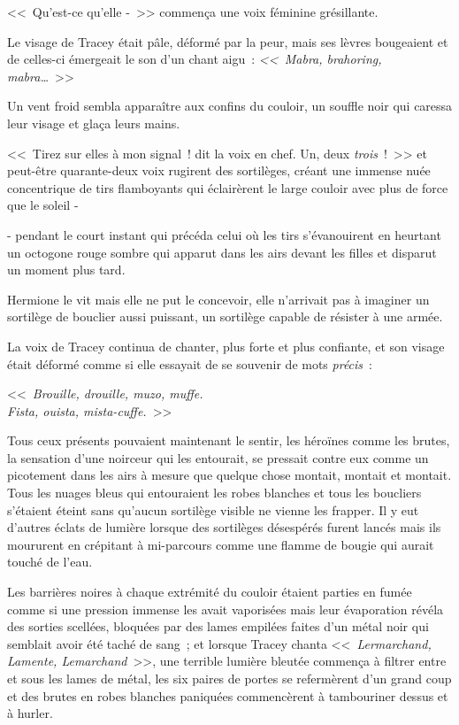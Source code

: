<<~Qu'est-ce qu'elle -~>> commença une voix féminine grésillante.

Le visage de Tracey était pâle, déformé par la peur, mais ses lèvres bougeaient et de celles-ci émergeait le son d'un chant aigu~: \emph{<<~Mabra, brahoring, mabra…}~>>

Un vent froid sembla apparaître aux confins du couloir, un souffle noir qui caressa leur visage et glaça leurs mains.

<<~Tirez sur elles à mon signal~! dit la voix en chef. Un, deux \emph{trois}~!~>> et peut-être quarante-deux voix rugirent des sortilèges, créant une immense nuée concentrique de tirs flamboyants qui éclairèrent le large couloir avec plus de force que le soleil -

- pendant le court instant qui précéda celui où les tirs s'évanouirent en heurtant un octogone rouge sombre qui apparut dans les airs devant les filles et disparut un moment plus tard.

Hermione le vit mais elle ne put le concevoir, elle n'arrivait pas à imaginer un sortilège de bouclier aussi puissant, un sortilège capable de résister à une armée.

La voix de Tracey continua de chanter, plus forte et plus confiante, et son visage était déformé comme si elle essayait de se souvenir de mots \emph{précis}~:

<<~\emph{Brouille, drouille, muzo, muffe.\\
Fista, ouista, mista-cuffe.}~>>

Tous ceux présents pouvaient maintenant le sentir, les héroïnes comme les brutes, la sensation d'une noirceur qui les entourait, se pressait contre eux comme un picotement dans les airs à mesure que quelque chose montait, montait et montait. Tous les nuages bleus qui entouraient les robes blanches et tous les boucliers s'étaient éteint sans qu'aucun sortilège visible ne vienne les frapper. Il y eut d'autres éclats de lumière lorsque des sortilèges désespérés furent lancés mais ils moururent en crépitant à mi-parcours comme une flamme de bougie qui aurait touché de l'eau.

Les barrières noires à chaque extrémité du couloir étaient parties en fumée comme si une pression immense les avait vaporisées mais leur évaporation révéla des sorties scellées, bloquées par des lames empilées faites d'un métal noir qui semblait avoir été taché de sang~; et lorsque Tracey chanta <<~\emph{Lermarchand, Lamente, Lemarchand}~>>, une terrible lumière bleutée commença à filtrer entre et sous les lames de métal, les six paires de portes se refermèrent d'un grand coup et des brutes en robes blanches paniquées commencèrent à tambouriner dessus et à hurler.

